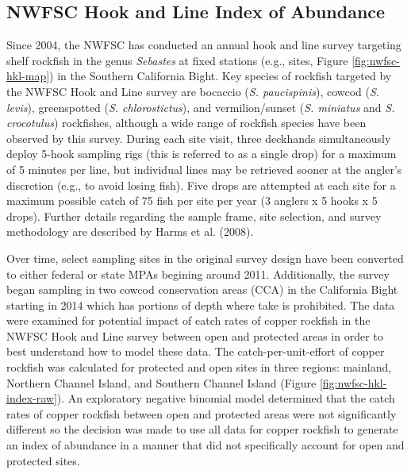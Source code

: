 \documentclass[11pt,
  english,
  letterpaper,
]{article}
\begin{document}
\hypertarget{nwfsc-hkl-model}{%
\subsection{NWFSC Hook and Line Index of Abundance}\label{nwfsc-hkl-model}}

Since 2004, the NWFSC has conducted an annual hook and line survey targeting shelf rockfish in the genus \emph{Sebastes} at fixed stations (e.g., sites, Figure \ref{fig:nwfsc-hkl-map}) in the Southern California Bight. Key species of rockfish targeted by the NWFSC Hook and Line survey are bocaccio (\emph{S. paucispinis}), cowcod (\emph{S. levis}), greenspotted (\emph{S. chlorostictus}), and vermilion/sunset (\emph{S. miniatus} and \emph{S. crocotulus}) rockfishes, although a wide range of rockfish species have been observed by this survey. During each site visit, three deckhands simultaneously deploy 5-hook sampling rigs (this is referred to as a single drop) for a maximum of 5 minutes per line, but individual lines may be retrieved sooner at the angler's discretion (e.g., to avoid losing fish). Five drops are attempted at each site for a maximum possible catch of 75 fish per site per year (3 anglers x 5 hooks x 5 drops). Further details regarding the sample frame, site selection, and survey methodology are described by Harms et al. (2008).

Over time, select sampling sites in the original survey design have been converted to either federal or state MPAs begining around 2011. Additionally, the survey began sampling in two cowcod conservation areas (CCA) in the California Bight starting in 2014 which has portions of depth where take is prohibited. The data were examined for potential impact of catch rates of copper rockfish in the NWFSC Hook and Line survey between open and protected areas in order to best understand how to model these data. The catch-per-unit-effort of copper rockfish was calculated for protected and open sites in three regions: mainland, Northern Channel Island, and Southern Channel Island (Figure \ref{fig:nwfsc-hkl-index-raw}). An exploratory negative binomial model determined that the catch rates of copper rockfish between open and protected areas were not significantly different so the decision was made to use all data for copper rockfish to generate an index of abundance in a manner that did not specifically account for open and protected sites.
\end{document}
